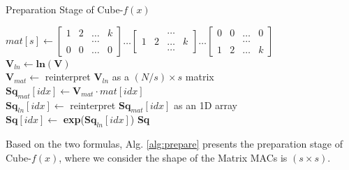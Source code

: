 \documentclass[12pt]{extbook}
\begin{document}
\begin{algorithm}[tbp]
    \caption{Preparation Stage of Cube-$f(x)$}
    \setlength{\arraycolsep}{1.2pt}
    \label{alg:prepare}
        
    
    \BlankLine
    \BlankLine
    
    $mat[s] \leftarrow 
            \begin{bmatrix} 1 & 2 & \dots & k   \\ 
                            &   &   \dots &     \\ 
                            0 & 0 & \dots & 0 
            \end{bmatrix}
            \dots
            \begin{bmatrix} &   &   \dots &     \\ 
                            1 & 2 & \dots & k   \\ 
                            &   &   \dots &     
            \end{bmatrix}
            \dots
            \begin{bmatrix} 0 & 0 & \dots & 0   \\
                            &   &   \dots &     \\ 
                            1 & 2 & \dots & k
            \end{bmatrix}
    $ \\
    \BlankLine
    \BlankLine
    $\textbf{V}_{ln} \leftarrow \textbf{ln}(\textbf{V})$ \\
    $\textbf{V}_{mat} \leftarrow$ reinterpret $\textbf{V}_{ln}$ as a $(N / s) \times s$ matrix \\
     {
        $\textbf{Sq}_{mat}[idx] \leftarrow \textbf{V}_{mat} \cdot mat[idx]$ \\
        $\textbf{Sq}_{ln}[idx] \leftarrow$ reinterpret $\textbf{Sq}_{mat}[idx]$ as an 1D array \\
        $\textbf{Sq}[idx] \leftarrow $ \textbf{exp}($\textbf{Sq}_{ln}[idx]$)
    }
    \Return \textbf{Sq}
\end{algorithm}

Based on the two formulas, Alg. \ref{alg:prepare} presents the preparation stage of Cube-$f(x)$, where we consider the shape of the Matrix MACs is $(s \times s)$.
\end{document}
